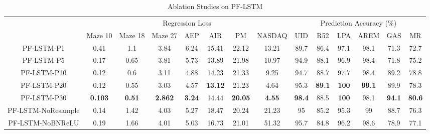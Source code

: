 \documentclass[letterpaper]{article} %
\begin{document}
\begin{table}[t]
		\centering
	\fontsize{8}{9}\selectfont
	\caption{Ablation Studies on PF-LSTM}
	\label{tab:ablation_details}
	\begin{tabular}{cccccccccccccc}
		\toprule
		& \multicolumn{7}{c}{Regression Loss}                                                                             & \multicolumn{6}{c}{Prediction Accuracy (\%)}\\
		& Maze 10        & Maze 18       & Maze 27        & AEP           & AIR            & PM             & NASDAQ        & UID           & R52           & LPA          & AREM          & GAS           & MR            \\
						\cmidrule(lr){0-7}\cmidrule(lr){9-14}
		PF-LSTM-P1         & 0.41           & 1.1           & 3.84           & 6.24          & 15.41          & 22.12          & 13.21         & 89.7          & 86.4          & 97.1         & 98.1          & 71.3          & 72.7          \\
		PF-LSTM-P5         & 0.17           & 0.65          & 3.81           & 5.73          & 13.89          & 21.98          & 10.97         & 94.9          & 88.1          & 96.9         & 98.4          & 71.8          & 75.2          \\
		PF-LSTM-P10        & 0.12           & 0.6           & 3.11           & 4.88          & 14.23          & 21.33          & 9.25          & 94.7          & 88.7          & 97.7         & 98.4          & 89.2          & 78.8          \\
		PF-LSTM-P20        & 0.12           & 0.55          & 3.03           & 4.57          & \textbf{13.12} & 21.23          & 4.64          & 95.3          & \textbf{89.1} & \textbf{100} & \textbf{99.1} & 89.9          & 78.3          \\
		PF-LSTM-P30        & \textbf{0.103} & \textbf{0.51} & \textbf{2.862} & \textbf{3.24} & 14.44          & \textbf{20.05} & \textbf{4.55} & \textbf{98.4} & 88.5          & \textbf{100} & 98.1          & \textbf{94.1} & \textbf{80.6} \\
		PF-LSTM-NoResample & 0.14           & 1.42          & 4.03           & 5.27          & 18.47          & 20.24          & 21.23         & 95            & 85.2          & 95.3         & 99            & 88.7          & 76.3          \\
		PF-LSTM-NoBNReLU   & 0.19           & 1.66          & 4.01           & 5.03          & 16.73          & 21.01          & 51.32         & 95.7          & 84.8          & 96.2         & 98.6          & 78.9          & 77.1          \\

\end{tabular}
\end{table}
\end{document}
